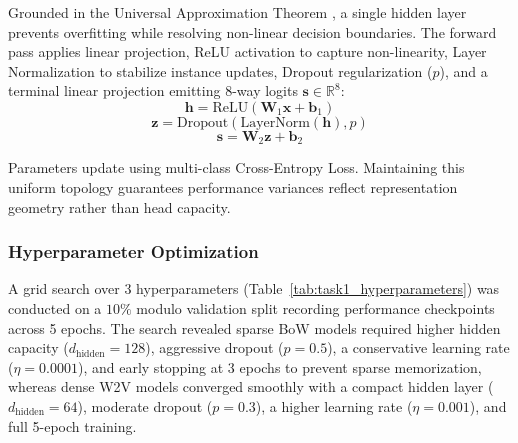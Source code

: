\documentclass[12pt, a4paper]{article}
\begin{document}
Grounded in the Universal Approximation Theorem \cite{hornik1989}, a single hidden layer prevents overfitting while resolving non-linear decision boundaries. The forward pass applies linear projection, ReLU activation to capture non-linearity, Layer Normalization to stabilize instance updates, Dropout regularization ($p$), and a terminal linear projection emitting 8-way logits $\mathbf{s} \in \mathbb{R}^8$:
\[
\mathbf{h} = \text{ReLU}(\mathbf{W}_1 \mathbf{x} + \mathbf{b}_1)
\]
\[
\mathbf{z} = \text{Dropout}(\text{LayerNorm}(\mathbf{h}), p)
\]
\[
\mathbf{s} = \mathbf{W}_2 \mathbf{z} + \mathbf{b}_2
\]

Parameters update using multi-class Cross-Entropy Loss. Maintaining this uniform topology guarantees performance variances reflect representation geometry rather than head capacity.

\subsubsection{Hyperparameter Optimization}
\label{subsubsec:task1_hyperparameters}

A grid search over 3 hyperparameters (Table~\ref{tab:task1_hyperparameters}) was conducted on a $10\%$ modulo validation split recording performance checkpoints across 5 epochs. The search revealed sparse BoW models required higher hidden capacity ($d_{\text{hidden}} = 128$), aggressive dropout ($p = 0.5$), a conservative learning rate ($\eta = 0.0001$), and early stopping at 3 epochs to prevent sparse memorization, whereas dense W2V models converged smoothly with a compact hidden layer ($d_{\text{hidden}} = 64$), moderate dropout ($p = 0.3$), a higher learning rate ($\eta = 0.001$), and full 5-epoch training.
\end{document}
